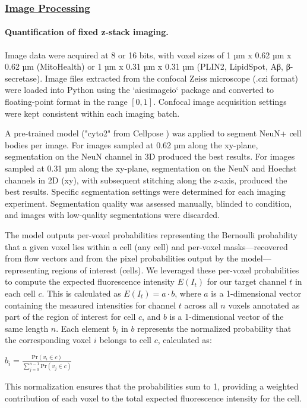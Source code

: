 \subsubsection{\underline{Image Processing}}

\paragraph{Quantification of fixed z-stack imaging.}
Image data were acquired at 8 or 16 bits, with voxel sizes of 1 µm x 0.62 µm x 0.62 µm (MitoHealth) or 1 µm x 0.31 µm x 0.31 µm (PLIN2, LipidSpot, Aβ, β-secretase). Image files extracted from the confocal Zeiss microscope (.czi format) were loaded into Python using the `aicsimageio` package and converted to floating-point format in the range $[0,1]$. Confocal image acquisition settings were kept consistent within each imaging batch.

A pre-trained model ("cyto2" from Cellpose \cite{Stringer2021-yn}) was applied to segment NeuN+ cell bodies per image. For images sampled at 0.62 µm along the xy-plane, segmentation on the NeuN channel in 3D produced the best results. For images sampled at 0.31 µm along the xy-plane, segmentation on the NeuN and Hoechst channels in 2D (xy), with subsequent stitching along the z-axis, produced the best results. Specific segmentation settings were determined for each imaging experiment. Segmentation quality was assessed manually, blinded to condition, and images with low-quality segmentations were discarded.

The model outputs per-voxel probabilities representing the Bernoulli probability that a given voxel lies within a cell (any cell) and per-voxel masks—recovered from flow vectors and from the pixel probabilities output by the model—representing regions of interest (cells). We leveraged these per-voxel probabilities to compute the expected fluorescence intensity $E(I_t)$ for our target channel $t$ in each cell $c$. This is calculated as $E(I_t) = a \cdot b$, where $a$ is a 1-dimensional vector containing the measured intensities for channel $t$ across all $n$ voxels annotated as part of the region of interest for cell $c$, and $b$ is a 1-dimensional vector of the same length $n$. Each element $b_i$ in $b$ represents the normalized probability that the corresponding voxel $i$ belongs to cell $c$, calculated as:

$b_i = \frac{\text{Pr}(v_i \in c)}{\sum_{j=0}^{n-1} \text{Pr}(v_j \in c)}$

This normalization ensures that the probabilities sum to 1, providing a weighted contribution of each voxel to the total expected fluorescence intensity for the cell.

